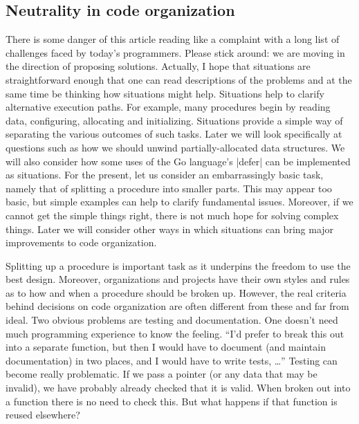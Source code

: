 \documentclass[10pt]{amsart}
\begin{document}
\subsection{Neutrality in code organization}
\label{sec:breakout}%

There is some danger of this article reading like a complaint with a
long list of challenges faced by today's programmers.  Please stick
around: we are moving in the direction of proposing solutions.
Actually, I hope that situations are straightforward enough that one
can read descriptions of the problems and at the same time be thinking
how situations might help.  Situations help to clarify alternative
execution paths.  For example, many procedures begin by reading data,
configuring, allocating and initializing.  Situations provide a simple
way of separating the various outcomes of such tasks.  Later we will
look specifically at questions such as how we should unwind
partially-allocated data structures.  We will also consider how some
uses of the Go language's |defer| can be implemented as situations.
%
For the present, let us consider an embarrassingly basic task, namely
that of splitting a procedure into smaller parts.  This may appear too
basic, but simple examples can help to clarify fundamental issues.
Moreover, if we cannot get the simple things right, there is not much
hope for solving complex things.  Later we will consider other ways in
which situations can bring major improvements to code organization.

Splitting up a procedure is important task as it underpins the freedom
to use the best design.  Moreover, organizations and projects have
their own styles and rules as to how and when a procedure should be
broken up.  However, the real criteria behind decisions on code
organization are often different from these and far from ideal.  Two
obvious problems are testing and documentation.  One doesn't need much
programming experience to know the feeling.  ``I'd prefer to break
this out into a separate function, but then I would have to document
(and maintain documentation) in two places, and I would have to write
tests, \ldots'' Testing can become really problematic.  If we pass a
pointer (or any data that may be invalid), we have probably already
checked that it is valid.  When broken out into a function there is no
need to check this.  But what happens if that function is reused
elsewhere?
\end{document}
